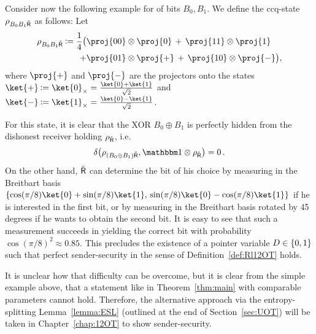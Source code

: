 Consider now the following example for \OT of bits $B_0,B_1$. We define the
ccq-state $\rho_{B_0 B_1 \tilde{\sf R}}$ as follows: Let
\[ \begin{split}
\rho_{B_0 B_1 \dR} \assign \frac{1}{4} \bigl( &\proj{00} \otimes
  \proj{0} \, + \, \proj{11} \otimes \proj{1} \\ 
+ &\proj{01} \otimes \proj{+} \, + \, \proj{10}
  \otimes \proj{-} \bigr), 
\end{split} \]
where $\proj{+}$ and $\proj{-}$ are the projectors onto the states $\ket{+} \assign
\ket{0}_\times = \frac{\ket{0}+\ket{1}}{\sqrt{2}}$ and $\ket{-}
\assign \ket{1}_\times= \frac{\ket{0}-\ket{1}}{\sqrt{2}}$.

For this state, it is clear that the XOR $B_0 \oplus B_1$ is perfectly
hidden from the dishonest receiver holding $\rho_{\tilde{\sf R}}$, i.e.
\[
\dist{ \rho_{(B_0 \oplus B_1) \dR} , \id \otimes \rho_{\dR} } = 0 \, .
\]
On the other hand, $\tilde{\sf R}$ can determine the bit of his choice by
measuring in the Breitbart basis $\set{\cos(\pi/8) \ket{0} +
  \sin(\pi/8) \ket{1}, \, \sin(\pi/8) \ket{0} - \cos(\pi/8) \ket{1}}$
if he is interested in the first bit, or by measuring in the Breitbart
basis rotated by 45 degrees if he wants to obtain the second bit. It
is easy to see that such a measurement succeeds in yielding the
correct bit with probability $\cos(\pi/8)^2 \approx 0.85$. This
precludes the existence of a pointer variable $D \in \{0,1\}$ such
that perfect sender-security in the sense of
Definition~\ref{def:Rl12OT} holds.

It is unclear how that difficulty can be overcome, but it is clear
from the simple example above, that a statement like in
Theorem~\ref{thm:main} with comparable parameters cannot hold.
Therefore, the alternative approach via the 
entropy-splitting
Lemma~\ref{lemma:ESL} (outlined at the end of Section~\ref{sec:UOT})
will be taken in Chapter~\ref{chap:12OT} to show sender-security.



